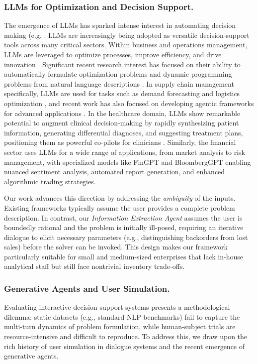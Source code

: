 \documentclass[mnsc,nonblindrev]{informs3_hide}
\begin{document}
\subsubsection{LLMs for Optimization and Decision Support.}
The emergence of LLMs has sparked intense interest in automating decision making (e.g. \cite{huang2025orlm}. LLMs are increasingly being adopted as versatile decision-support tools across many critical sectors. Within business and operations management, LLMs are leveraged to optimize processes, improve efficiency, and drive innovation \citep{li2024large}. Significant recent research interest has focused on their ability to automatically formulate optimization problems and dynamic programming problems from natural language descriptions \citep{ahmaditeshnizi2023optimus,ahmaditeshnizi2024optimus,zhou2025auto,liang2025llm}. In supply chain management specifically, LLMs are used for tasks such as demand forecasting and logistics optimization \citep{lu2024optimizing}, and recent work has also focused on developing agentic frameworks for advanced applications \citep{quan2024invagent,qi2025leveraging,long2025autonomous,simchi2026large,cohen2025supply}. In the healthcare domain, LLMs show remarkable potential to augment clinical decision-making by rapidly synthesizing patient information, generating differential diagnoses, and suggesting treatment plans, positioning them as powerful co-pilots for clinicians \citep{shah2023creation,nazi2024large}. Similarly, the financial sector uses LLMs for a wide range of applications, from market analysis to risk management, with specialized models like FinGPT and BloombergGPT enabling nuanced sentiment analysis, automated report generation, and enhanced algorithmic trading strategies.

Our work advances this direction by addressing the \emph{ambiguity} of the inputs. Existing frameworks typically assume the user provides a complete problem description. In contrast, our \emph{Information Extraction Agent} assumes the user is boundedly rational and the problem is initially ill-posed, requiring an iterative dialogue to elicit necessary parameters (e.g., distinguishing backorders from lost sales) before the solver can be invoked. This design makes our framework particularly suitable for small and medium-sized enterprises that lack in-house analytical staff but still face nontrivial inventory trade-offs. 




\subsubsection{Generative Agents and User Simulation.}
Evaluating interactive decision support systems presents a methodological dilemma: static datasets (e.g., standard NLP benchmarks) fail to capture the multi-turn dynamics of problem formulation, while human-subject trials are resource-intensive and difficult to reproduce. To address this, we draw upon the rich history of user simulation in dialogue systems and the recent emergence of generative agents.
\end{document}
